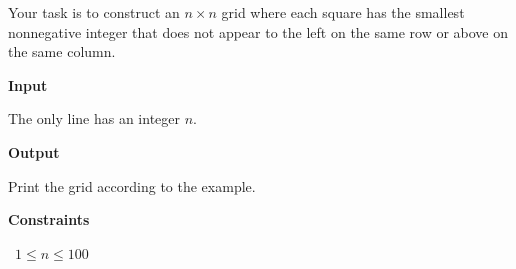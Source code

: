Your task is to construct an $n \times n$ grid where each square has the smallest nonnegative integer that does not appear to the left on the same row or above on the same column.

\vspace{0.3cm}\noindent\textbf{Input}

The only line has an integer $n$.

\vspace{0.3cm}\noindent\textbf{Output}

Print the grid according to the example.

\vspace{0.3cm}\noindent\textbf{Constraints}

\textbullet\ $1 \le n \le 100$